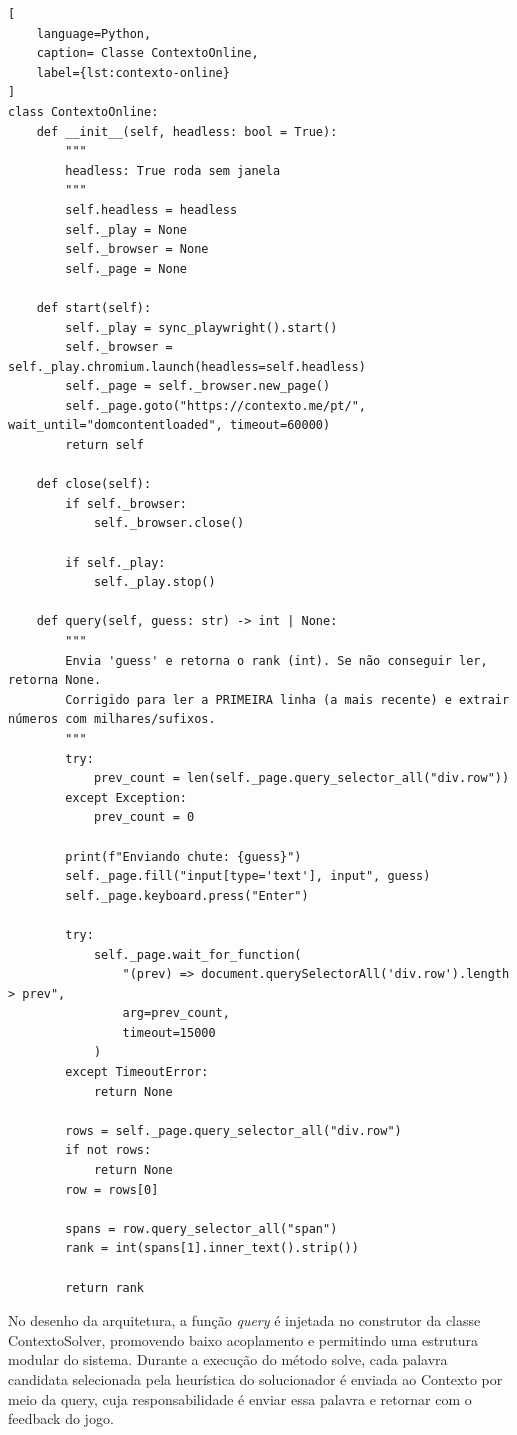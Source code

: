 \begin{lstlisting}[
    language=Python,
    caption= Classe ContextoOnline,
    label={lst:contexto-online}
]
class ContextoOnline:
    def __init__(self, headless: bool = True):
        """
        headless: True roda sem janela
        """
        self.headless = headless
        self._play = None
        self._browser = None
        self._page = None

    def start(self):
        self._play = sync_playwright().start()
        self._browser = self._play.chromium.launch(headless=self.headless)
        self._page = self._browser.new_page()
        self._page.goto("https://contexto.me/pt/", wait_until="domcontentloaded", timeout=60000)
        return self
    
    def close(self):
        if self._browser:
            self._browser.close()

        if self._play:
            self._play.stop()

    def query(self, guess: str) -> int | None:
        """
        Envia 'guess' e retorna o rank (int). Se não conseguir ler, retorna None.
        Corrigido para ler a PRIMEIRA linha (a mais recente) e extrair números com milhares/sufixos.
        """
        try:
            prev_count = len(self._page.query_selector_all("div.row"))
        except Exception:
            prev_count = 0

        print(f"Enviando chute: {guess}")
        self._page.fill("input[type='text'], input", guess)
        self._page.keyboard.press("Enter")

        try:
            self._page.wait_for_function(
                "(prev) => document.querySelectorAll('div.row').length > prev",
                arg=prev_count,
                timeout=15000
            )
        except TimeoutError:
            return None

        rows = self._page.query_selector_all("div.row")
        if not rows:
            return None
        row = rows[0]

        spans = row.query_selector_all("span")
        rank = int(spans[1].inner_text().strip())
        
        return rank
\end{lstlisting}

No desenho da arquitetura, a função \textit{query} é injetada no construtor da classe ContextoSolver, promovendo baixo acoplamento e permitindo uma estrutura modular do sistema. Durante a execução do método solve, cada palavra candidata selecionada pela heurística do solucionador é enviada ao Contexto por meio da query, cuja responsabilidade é enviar essa palavra e retornar com o feedback do jogo.

